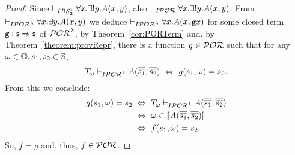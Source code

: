{\begin{proof}
Since
$\vdash_{I{\mathit{RS}^1_2}} \forall x.\exists ! y.A(x,y)$,
also $\vdash_{I\mathcal{POR}} \forall x.\exists! y.A (x,y)$.
From $\vdash_{I\mathcal{POR}^\lambda} \forall x.\exists y.A(x,y)$
we deduce $\vdash_{I\mathcal{POR}^\lambda} \forall x.A(x,\mathtt{g}x)$
for some closed term
$\mathtt{g}:\mathsf{s} \Rightarrow \mathsf{s}$ of $\mathcal{POR}^\lambda$, by
Theorem~\ref{cor:PORTerm} and,
%
by Theorem~\ref{theorem:provRepr},
there is a function $g\in \mathcal{POR}$ such that
for any $\omega \in \mathbb{O}, s_1,s_2\in \mathbb{S}$,
$$
T_\omega \vdash_{I\mathcal{POR}^\lambda} A(\overline{\overline{s_1}},\overline{\overline{s_2}})
\ \Leftrightarrow \ g(s_1,\omega)=s_2.
$$
From this we conclude:
\begin{align*}
g(s_1,\omega)=s_2 \ & \Leftrightarrow \ T_\omega \vdash_{I\mathcal{POR}^\lambda}
A(\overline{\overline{s_1}},\overline{\overline{s_2}}) \\
&\stackrel{~}{\Leftrightarrow} \
\omega \in \llbracket A(\overline{\overline{s_1}},
\overline{\overline{s_2}})\rrbracket \\
& \Leftrightarrow \ f(s_1,\omega)=s_2.
\end{align*}
So, $f=g$ and, thus,
$f\in \mathcal{POR}$.
\end{proof}

}
